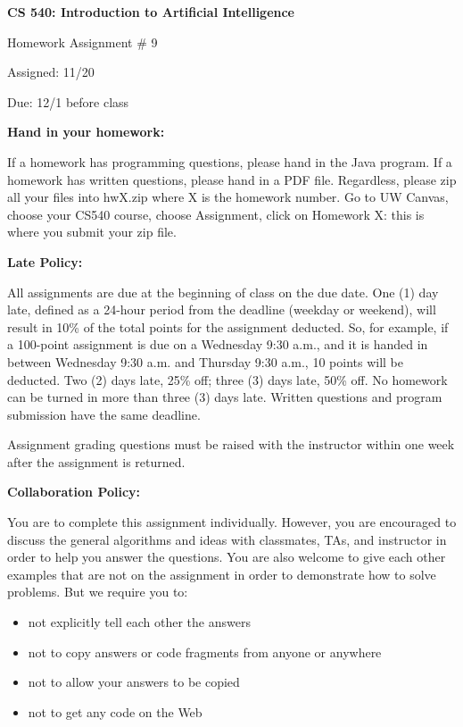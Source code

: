 \documentclass{article}
\begin{document}
\begin{center}
{\bf \large CS 540: Introduction to Artificial Intelligence

Homework Assignment \# 9

\vspace{0.5cm}

Assigned:  11/20 

Due:  12/1 before class} 
\end{center}

\vspace{1cm}

\begin{center}
{\bf \Large Hand in your homework:}
\end{center}

If a homework has programming questions, please hand in the Java program.  
If a homework has written questions, please hand in a PDF file.
Regardless, please zip all your files into hwX.zip where X is the homework number.
Go to UW Canvas, choose your CS540 course, choose Assignment, click on Homework X: this is where you submit your zip file. 

\vspace{1cm}

\begin{center}
{\bf \Large Late Policy:}
\end{center}

All assignments are due at the beginning of class on the due date. One (1) day late, defined as a 24-hour period from the deadline (weekday or weekend), will result in 10\% of the  total points for the assignment deducted.  So, for example, if a 100-point assignment is due on a Wednesday 9:30 a.m., and it is handed in between Wednesday 9:30 a.m. and Thursday 9:30 a.m., 10 points will be deducted. Two (2) days late, 25\% off; three (3) days late, 50\% off. No homework can be turned in more than three (3) days late. Written questions and program submission have the same deadline.  

Assignment grading questions must be raised with the instructor within one week after the assignment is returned.

\vspace{4pt}

\begin{center}
{\bf \Large Collaboration Policy:}
\end{center}

You  are  to  complete  this  assignment  individually.  However,  you  are  encouraged  to  discuss  the  general algorithms and ideas with classmates, TAs, and instructor in order to help you answer the questions. You are also welcome to give each other examples that are not on the assignment in order to demonstrate how to solve problems. But we require you to:
\begin{itemize}
\item not explicitly tell each other the answers
\item not to copy answers or code fragments from anyone or anywhere
\item not to allow your answers to be copied
\item not to get any code on the Web
\end{itemize}
\end{document}

